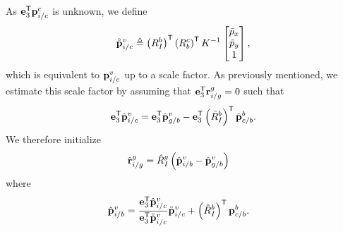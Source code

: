 As $\boldsymbol{\mathrm{e}}_3^{\mathsf{T}} \boldsymbol{\mathrm{p}}_{i/c}^c$ is unknown, we define 
\begin{equation}
  \accentset{\circ}{\boldsymbol{\mathrm{p}}}_{i/c}^v
  \triangleq
   \left( R_I^b
  \right)^{\mathsf{T}} \left( R_b^c \right)^{\mathsf{T}} K^{-1} \begin{bmatrix}
    \bar{p}_x \\ \bar{p}_y \\ 1
  \end{bmatrix},
\end{equation}
which is equivalent to $\boldsymbol{\mathrm{p}}_{i/c}^v$ up to a scale factor. As previously
mentioned, we estimate this scale factor by assuming that $\boldsymbol{\mathrm{e}}_3^{\mathsf{T}}
\boldsymbol{\mathrm{r}}_{i/g}^g = 0$ such that
\begin{equation}
  \boldsymbol{\mathrm{e}}_3^{\mathsf{T}} \hat{\boldsymbol{\mathrm{p}}}_{i/c}^v = \boldsymbol{\mathrm{e}}_3^{\mathsf{T}} \hat{\boldsymbol{\mathrm{p}}}_{g/b}^v -
  \boldsymbol{\mathrm{e}}_3^{\mathsf{T}} \left( \hat{R}_I^b \right)^{\mathsf{T}} \hat{\boldsymbol{\mathrm{p}}}_{c/b}^b.
\end{equation}
We therefore initialize
\begin{align}
    \hat{\boldsymbol{\mathrm{r}}}_{i/g}^g &= \hat{R}_I^g \left( \hat{\boldsymbol{\mathrm{p}}}_{i/b}^v -
    \hat{\boldsymbol{\mathrm{p}}}_{g/b}^v \right)
\end{align}
where
\begin{align}
    \hat{\boldsymbol{\mathrm{p}}}_{i/b}^v &= \frac{\boldsymbol{\mathrm{e}}_3^{\mathsf{T}}
  \hat{\boldsymbol{\mathrm{p}}}_{i/c}^v}{\boldsymbol{\mathrm{e}}_3^{\mathsf{T}} \accentset{\circ}{\boldsymbol{\mathrm{p}}}_{i/c}^v}
  \accentset{\circ}{\boldsymbol{\mathrm{p}}}_{i/c}^v+ \left( \hat{R}_I^b \right)^{\mathsf{T}}
  \boldsymbol{\mathrm{p}}_{c/b}^b.
\end{align}

